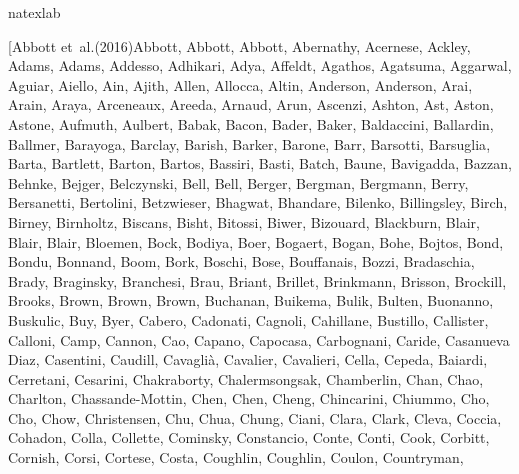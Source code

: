 \documentclass[times,tight]{aastex631}
\begin{document}
\begin{thebibliography}{}
\expandafter\ifx\csname natexlab\endcsname\relax\def\natexlab#1{#1}\fi
\providecommand{\url}[1]{\href{#1}{#1}}
\providecommand{\dodoi}[1]{doi:~\href{http://doi.org/#1}{\nolinkurl{#1}}}
\providecommand{\doeprint}[1]{\href{http://ascl.net/#1}{\nolinkurl{http://ascl.net/#1}}}
\providecommand{\doarXiv}[1]{\href{https://arxiv.org/abs/#1}{\nolinkurl{https://arxiv.org/abs/#1}}}

\bibitem[{{Abbott} {et~al.}(2016){Abbott}, {Abbott}, {Abbott}, {Abernathy},
  {Acernese}, {Ackley}, {Adams}, {Adams}, {Addesso}, {Adhikari}, {Adya},
  {Affeldt}, {Agathos}, {Agatsuma}, {Aggarwal}, {Aguiar}, {Aiello}, {Ain},
  {Ajith}, {Allen}, {Allocca}, {Altin}, {Anderson}, {Anderson}, {Arai},
  {Arain}, {Araya}, {Arceneaux}, {Areeda}, {Arnaud}, {Arun}, {Ascenzi},
  {Ashton}, {Ast}, {Aston}, {Astone}, {Aufmuth}, {Aulbert}, {Babak}, {Bacon},
  {Bader}, {Baker}, {Baldaccini}, {Ballardin}, {Ballmer}, {Barayoga},
  {Barclay}, {Barish}, {Barker}, {Barone}, {Barr}, {Barsotti}, {Barsuglia},
  {Barta}, {Bartlett}, {Barton}, {Bartos}, {Bassiri}, {Basti}, {Batch},
  {Baune}, {Bavigadda}, {Bazzan}, {Behnke}, {Bejger}, {Belczynski}, {Bell},
  {Bell}, {Berger}, {Bergman}, {Bergmann}, {Berry}, {Bersanetti}, {Bertolini},
  {Betzwieser}, {Bhagwat}, {Bhandare}, {Bilenko}, {Billingsley}, {Birch},
  {Birney}, {Birnholtz}, {Biscans}, {Bisht}, {Bitossi}, {Biwer}, {Bizouard},
  {Blackburn}, {Blair}, {Blair}, {Blair}, {Bloemen}, {Bock}, {Bodiya}, {Boer},
  {Bogaert}, {Bogan}, {Bohe}, {Bojtos}, {Bond}, {Bondu}, {Bonnand}, {Boom},
  {Bork}, {Boschi}, {Bose}, {Bouffanais}, {Bozzi}, {Bradaschia}, {Brady},
  {Braginsky}, {Branchesi}, {Brau}, {Briant}, {Brillet}, {Brinkmann},
  {Brisson}, {Brockill}, {Brooks}, {Brown}, {Brown}, {Brown}, {Buchanan},
  {Buikema}, {Bulik}, {Bulten}, {Buonanno}, {Buskulic}, {Buy}, {Byer},
  {Cabero}, {Cadonati}, {Cagnoli}, {Cahillane}, {Bustillo}, {Callister},
  {Calloni}, {Camp}, {Cannon}, {Cao}, {Capano}, {Capocasa}, {Carbognani},
  {Caride}, {Casanueva Diaz}, {Casentini}, {Caudill}, {Cavagli{\`a}},
  {Cavalier}, {Cavalieri}, {Cella}, {Cepeda}, {Baiardi}, {Cerretani},
  {Cesarini}, {Chakraborty}, {Chalermsongsak}, {Chamberlin}, {Chan}, {Chao},
  {Charlton}, {Chassande-Mottin}, {Chen}, {Chen}, {Cheng}, {Chincarini},
  {Chiummo}, {Cho}, {Cho}, {Chow}, {Christensen}, {Chu}, {Chua}, {Chung},
  {Ciani}, {Clara}, {Clark}, {Cleva}, {Coccia}, {Cohadon}, {Colla}, {Collette},
  {Cominsky}, {Constancio}, {Conte}, {Conti}, {Cook}, {Corbitt}, {Cornish},
  {Corsi}, {Cortese}, {Costa}, {Coughlin}, {Coughlin}, {Coulon}, {Countryman},
}
\end{thebibliography}
\end{document}
